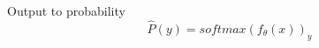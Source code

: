 \documentclass[preview]{standalone}
\begin{document}
\begin{center}
Output to probability $$\hat{P}(y) = softmax(f_{\theta}(x))_y$$
\end{center}
\end{document}
